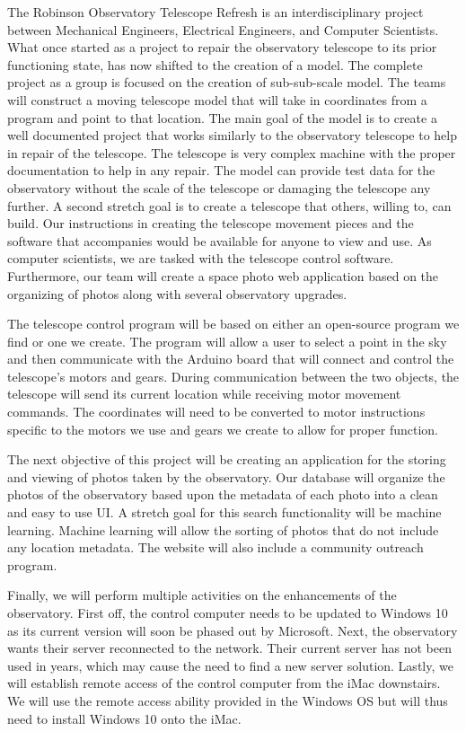 \documentclass[12pt]{report}
\begin{document}
The Robinson Observatory Telescope Refresh is an interdisciplinary project between Mechanical Engineers, Electrical Engineers, and Computer Scientists. What once started as a project to repair the observatory telescope to its prior functioning state, has now shifted to the creation of a model. The complete project as a group is focused on the creation of sub-sub-scale model. The teams will construct a moving telescope model that will take in coordinates from a program and point to that location. The main goal of the model is to create a well documented project that works similarly to the observatory telescope to help in repair of the telescope. The telescope is very complex machine with the proper documentation to help in any repair. The model can provide test data for the observatory without the scale of the telescope or damaging the telescope any further. A second stretch goal is to create a telescope that others, willing to, can build. Our instructions in creating the telescope movement pieces and the software that accompanies would be available for anyone to view and use. As computer scientists, we are tasked with the telescope control software. Furthermore, our team will create a space photo web application based on the organizing of photos along with several observatory upgrades.

The telescope control program will be based on either an open-source program we find or one we create. The program will allow a user to select a point in the sky and then communicate with the Arduino board that will connect and control the telescope’s motors and gears. During communication between the two objects, the telescope will send its current location while receiving motor movement commands. The coordinates will need to be converted to motor instructions specific to the motors we use and gears we create to allow for proper function.

The next objective of this project will be creating an application for the storing and viewing of photos taken by the observatory. Our database will organize the photos of the observatory based upon the metadata of each photo into a clean and easy to use UI. A stretch goal for this search functionality will be machine learning. Machine learning will allow the sorting of photos that do not include any location metadata. The website will also include a community outreach program.

Finally, we will perform multiple activities on the enhancements of the observatory. First off, the control computer needs to be updated to Windows 10 as its current version will soon be phased out by Microsoft. Next, the observatory wants their server reconnected to the network. Their current server has not been used in years, which may cause the need to find a new server solution. Lastly, we will establish remote access of the control computer from the iMac downstairs. We will use the remote access ability provided in the Windows OS but will thus need to install Windows 10 onto the iMac.
\end{document}
